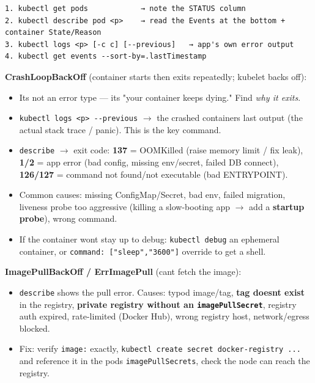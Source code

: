 \documentclass[11pt]{article}
\providecommand{\tightlist}{\setlength{\itemsep}{1pt}\setlength{\parskip}{0pt}}
\begin{document}
\setcodelang{}

\begin{verbatim}
1. kubectl get pods            → note the STATUS column
2. kubectl describe pod <p>    → read the Events at the bottom + container State/Reason
3. kubectl logs <p> [-c c] [--previous]   → app's own error output
4. kubectl get events --sort-by=.lastTimestamp
\end{verbatim}

\textbf{CrashLoopBackOff} (container starts then exits repeatedly; kubelet backs off):

\begin{itemize}
\tightlist
\item
  It\textquotesingle s not an error type --- it\textquotesingle s "your container keeps dying." Find \emph{why it exits}.
\item
  \texttt{kubectl\ logs\ \textless{}p\textgreater{}\ -\/-previous} \(\rightarrow\) the crashed container\textquotesingle s last output (the actual stack trace / panic). This is the key command.
\item
  \texttt{describe} \(\rightarrow\) exit code: \textbf{137} = OOMKilled (raise memory limit / fix leak), \textbf{1/2} = app error (bad config, missing env/secret, failed DB connect), \textbf{126/127} = command not found/not executable (bad ENTRYPOINT).
\item
  Common causes: missing ConfigMap/Secret, bad env, failed migration, liveness probe too aggressive (killing a slow-booting app \(\rightarrow\) add a \textbf{startup probe}), wrong command.
\item
  If the container won\textquotesingle t stay up to debug: \texttt{kubectl\ debug} an ephemeral container, or \texttt{command:\ {[}"sleep","3600"{]}} override to get a shell.
\end{itemize}

\textbf{ImagePullBackOff / ErrImagePull} (can\textquotesingle t fetch the image):

\begin{itemize}
\tightlist
\item
  \texttt{describe} shows the pull error. Causes: typo\textquotesingle d image/tag, \textbf{tag doesn\textquotesingle t exist} in the registry, \textbf{private registry without an \texttt{imagePullSecret}}, registry auth expired, rate-limited (Docker Hub), wrong registry host, network/egress blocked.
\item
  Fix: verify \texttt{image:} exactly, \texttt{kubectl\ create\ secret\ docker-registry\ ...} and reference it in the pod\textquotesingle s \texttt{imagePullSecrets}, check the node can reach the registry.
\end{itemize}
\end{document}
